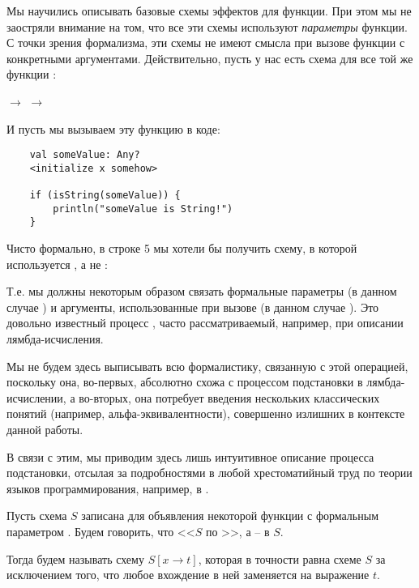 Мы научились описывать базовые схемы эффектов для функции. При этом мы не заостряли внимание на том, что все эти схемы используют \emph{параметры} функции. С точки зрения формализма, эти схемы не имеют смысла при вызове функции с конкретными аргументами. Действительно, пусть у нас есть схема для все той же функции :

{
         $\rightarrow$ 
         $\rightarrow$ 
}
{}

И пусть мы вызываем эту функцию в коде:

\begin{verbatim}
    val someValue: Any?
    <initialize x somehow>
    
    if (isString(someValue)) {
        println("someValue is String!")
    }
\end{verbatim}

Чисто формально, в строке 5 мы хотели бы получить схему, в которой используется , а не :


Т.е. мы должны некоторым образом связать формальные параметры (в данном случае ) и аргументы, использованные при вызове (в данном случае ). Это довольно известный процесс , часто рассматриваемый, например, при описании лямбда-исчисления. 

Мы не будем здесь выписывать всю формалистику, связанную с этой операцией, поскольку она, во-первых, абсолютно схожа с процессом подстановки в лямбда-исчислении, а во-вторых, она потребует введения нескольких классических понятий (например, альфа-эквивалентности), совершенно излишних в контексте данной работы. 

В связи с этим, мы приводим здесь лишь интуитивное описание процесса подстановки, отсылая за подробностями в любой хрестоматийный труд по теории языков программирования, например, в \cite{TAPL}.

\begin{definition}
     Пусть схема $S$ записана для объявления некоторой функции с формальным параметром . Будем говорить, что <<$S$  по >>, а  --  в $S$.
     
     Тогда  будем называть схему $S[x \to t]$, которая в точности равна схеме $S$ за исключением того, что любое вхождение  в ней заменяется на выражение $t$. 
\end{definition}

